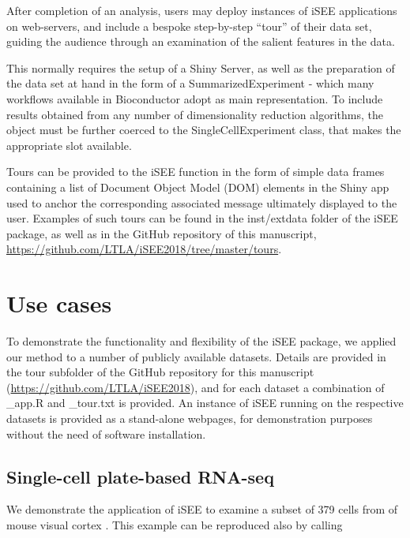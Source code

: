 \documentclass[10pt,a4paper,twocolumn]{article}
\begin{document}
After completion of an analysis, users may deploy instances of iSEE applications on web-servers, and include a bespoke step-by-step ``tour'' of their data set, guiding the audience through an examination of the salient features in the data.

This normally requires the setup of a Shiny Server, %
as well as the preparation of the data set at hand in the form of a SummarizedExperiment - which many workflows available in Bioconductor adopt as main representation.
To include results obtained from any number of dimensionality reduction algorithms, the object must be further coerced to the SingleCellExperiment class, that makes the appropriate slot available.

Tours can be provided to the iSEE function in the form of simple data frames containing a list of Document Object Model (DOM) elements in the Shiny app used to anchor the corresponding associated message ultimately displayed to the user.
Examples of such tours can be found in the inst/extdata folder of the iSEE package, as well as in the GitHub repository of this manuscript, \url{https://github.com/LTLA/iSEE2018/tree/master/tours}.


\section*{Use cases} %
To demonstrate the functionality and flexibility of the iSEE package, we applied our method to a number of publicly available datasets.
Details are provided in the tour subfolder of the GitHub repository for this manuscript (\url{https://github.com/LTLA/iSEE2018}), and for each dataset a combination of \_app.R and \_tour.txt is provided.
An instance of iSEE running on the respective datasets is provided as a stand-alone webpages, for demonstration purposes without the need of software installation.

\subsection*{Single-cell plate-based RNA-seq}
We demonstrate the application of iSEE to examine a subset of 379 cells from of mouse visual cortex \citep{tasic2016allen}.
This example can be reproduced also by calling
\end{document}
